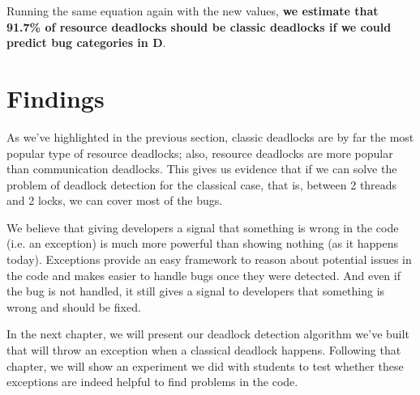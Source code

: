 Running the same equation again with the new values, \textbf{we estimate that 91.7\% of resource deadlocks should be classic deadlocks if we could predict bug categories in D}.

\section{Findings}

As we've highlighted in the previous section, classic deadlocks are by far the most popular type of resource deadlocks; also, resource deadlocks are more popular than communication deadlocks. This gives us evidence that if we can solve the problem of deadlock detection for the classical case, that is, between 2 threads and 2 locks, we can cover most of the bugs.

We believe that giving developers a signal that something is wrong in the code (i.e. an exception) is much more powerful than showing nothing (as it happens today). Exceptions provide an easy framework to reason about potential issues in the code and makes easier to handle bugs once they were detected. And even if the bug is not handled, it still gives a signal to developers that something is wrong and should be fixed.

In the next chapter, we will present our deadlock detection algorithm we've built that will throw an exception when a classical deadlock happens. Following that chapter, we will show an experiment we did with students to test whether these exceptions are indeed helpful to find problems in the code.

